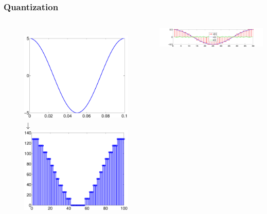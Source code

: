 \documentclass[mathserif,9pt,handout]{beamer}
\begin{document}
\begin{frame}\frametitle{Quantization}\small
  \begin{columns}
    \begin{figure}
    \centering
    \includegraphics[height=.35\textheight]{sampling_p0.pdf}\\
    $\downarrow$ \\
    \includegraphics[height=.35\textheight]{sampling_p2.pdf}
    \end{figure}
    \includegraphics[width=\textwidth]{q_err.pdf} \\
    \vspace{1em}
    

\end{columns}
\end{frame}
\end{document}
